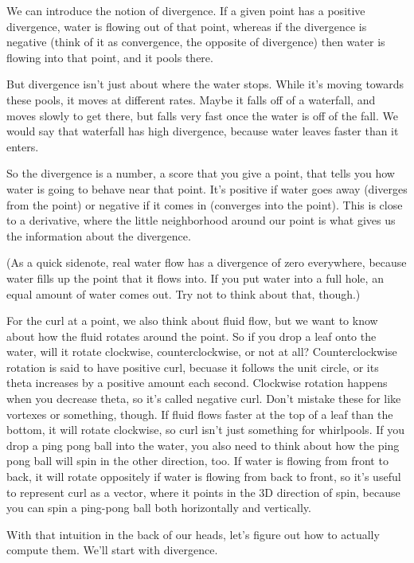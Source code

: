 \documentclass[12pt, letterpaper]{article}
\begin{document}
We can introduce the notion of divergence.
If a given point has a positive divergence, water is flowing out of that point, whereas if the divergence is negative (think of it as convergence, the opposite of divergence)
then water is flowing into that point, and it pools there.

But divergence isn't just about where the water stops.
While it's moving towards these pools, it moves at different rates.
Maybe it falls off of a waterfall, and moves slowly to get there, but falls very fast once the water is off of the fall.
We would say that waterfall has high divergence, because water leaves faster than it enters.

So the divergence is a number, a score that you give a point, that tells you how water is going to behave near that point.
It's positive if water goes away (diverges from the point) or negative if it comes in (converges into the point).
This is close to a derivative, where the little neighborhood around our point is what gives us the information about the divergence.

(As a quick sidenote, real water flow has a divergence of zero everywhere, because water fills up the point that it flows into.
If you put water into a full hole, an equal amount of water comes out.
Try not to think about that, though.)

For the curl at a point, we also think about fluid flow, but we want to know about how the fluid rotates around the point.
So if you drop a leaf onto the water, will it rotate clockwise, counterclockwise, or not at all?
Counterclockwise rotation is said to have positive curl, becuase it follows the unit circle, or its theta increases by a positive amount each second.
Clockwise rotation happens when you decrease theta, so it's called negative curl.
Don't mistake these for like vortexes or something, though.
If fluid flows faster at the top of a leaf than the bottom, it will rotate clockwise, so curl isn't just something for whirlpools.
If you drop a ping pong ball into the water, you also need to think about how the ping pong ball will spin in the other direction, too.
If water is flowing from front to back, it will rotate oppositely if water is flowing from back to front, so it's useful to represent curl as a vector,
where it points in the 3D direction of spin, because you can spin a ping-pong ball both horizontally and vertically.

With that intuition in the back of our heads, let's figure out how to actually compute them. We'll start with divergence.
\end{document}
